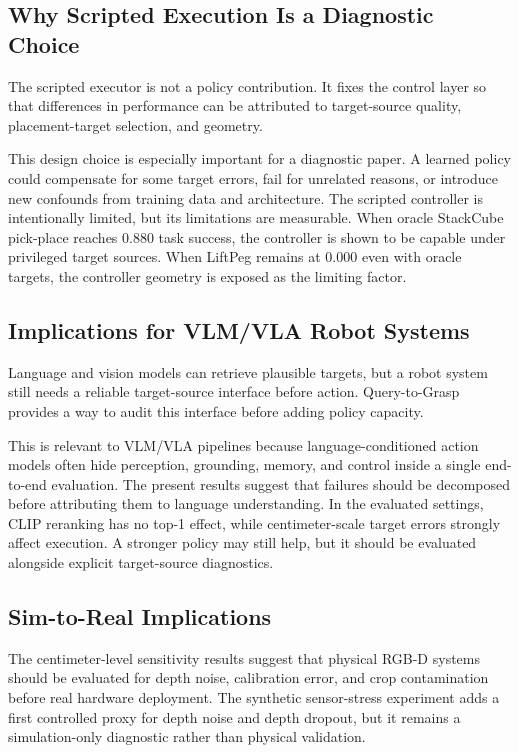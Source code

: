 \documentclass[preprint,12pt]{elsarticle}
\begin{document}
\subsection{Why Scripted Execution Is a Diagnostic Choice}

The scripted executor is not a policy contribution. It fixes the control layer
so that differences in performance can be attributed to target-source quality,
placement-target selection, and geometry.

This design choice is especially important for a diagnostic paper. A learned
policy could compensate for some target errors, fail for unrelated reasons, or
introduce new confounds from training data and architecture. The scripted
controller is intentionally limited, but its limitations are measurable. When
oracle StackCube pick-place reaches 0.880 task success, the controller is shown
to be capable under privileged target sources. When LiftPeg remains at 0.000
even with oracle targets, the controller geometry is exposed as the limiting
factor.

\subsection{Implications for VLM/VLA Robot Systems}

Language and vision models can retrieve plausible targets, but a robot system
still needs a reliable target-source interface before action. Query-to-Grasp
provides a way to audit this interface before adding policy capacity.

This is relevant to VLM/VLA pipelines because language-conditioned action
models often hide perception, grounding, memory, and control inside a single
end-to-end evaluation. The present results suggest that failures should be
decomposed before attributing them to language understanding. In the evaluated
settings, CLIP reranking has no top-1 effect, while centimeter-scale target
errors strongly affect execution. A stronger policy may still help, but it
should be evaluated alongside explicit target-source diagnostics.

\subsection{Sim-to-Real Implications}

The centimeter-level sensitivity results suggest that physical RGB-D systems
should be evaluated for depth noise, calibration error, and crop contamination
before real hardware deployment. The synthetic sensor-stress experiment adds a
first controlled proxy for depth noise and depth dropout, but it remains a
simulation-only diagnostic rather than physical validation.
\end{document}

